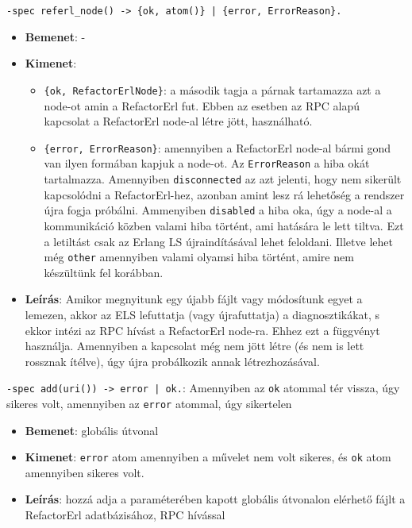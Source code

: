     \noindent \lstinline'-spec referl_node() -> {ok, atom()} | {error, ErrorReason}. '
        \begin{itemize}
            \item \textbf{Bemenet}: -
            \item \textbf{Kimenet}: 
            \begin{itemize}
                \item \lstinline|{ok, RefactorErlNode}|: a második tagja a párnak tartamazza azt a node-ot amin a RefactorErl fut. Ebben az esetben az RPC alapú kapcsolat a RefactorErl node-al létre jött, használható.
                \item \lstinline|{error, ErrorReason}|: amennyiben a RefactorErl node-al bármi gond van ilyen formában kapjuk a node-ot. Az \lstinline{ErrorReason} a hiba okát tartalmazza. Amennyiben \lstinline{disconnected} az azt jelenti, hogy nem sikerült kapcsolódni a RefactorErl-hez, azonban amint lesz rá lehetőség a rendszer újra fogja próbálni. Ammenyiben \lstinline{disabled} a hiba oka, úgy a node-al a kommunikáció közben valami hiba történt, ami hatására le lett tiltva. Ezt a letiltást csak az Erlang LS újraindításával lehet feloldani. Illetve lehet még \lstinline{other} amennyiben valami olyamsi hiba történt, amire nem készültünk fel korábban.
            \end{itemize}
            \item \textbf{Leírás}: Amikor megnyitunk egy újabb fájlt vagy módosítunk egyet a lemezen, akkor az ELS  lefuttatja (vagy újrafuttatja) a diagnosztikákat, s ekkor intézi az RPC hívást a RefactorErl node-ra. Ehhez ezt a függvényt használja. Amennyiben a kapcsolat még nem jött létre (és nem is lett rossznak ítélve), úgy újra probálkozik annak létrezhozásával.
        \end{itemize}
    
    
    
    \noindent \lstinline{-spec add(uri()) -> error | ok.}:  Amennyiben az \lstinline{ok} atommal tér vissza, úgy sikeres volt, amennyiben az 
    \lstinline{error} atommal, úgy sikertelen
    \begin{itemize}
            \item \textbf{Bemenet}: globális útvonal
            \item \textbf{Kimenet}: \lstinline{error} atom amennyiben a művelet nem volt sikeres, és \lstinline{ok} atom amennyiben sikeres volt.
            \item \textbf{Leírás}: hozzá adja a paraméterében kapott globális útvonalon elérhető fájlt a RefactorErl adatbázisához, RPC hívással
        \end{itemize}
    
